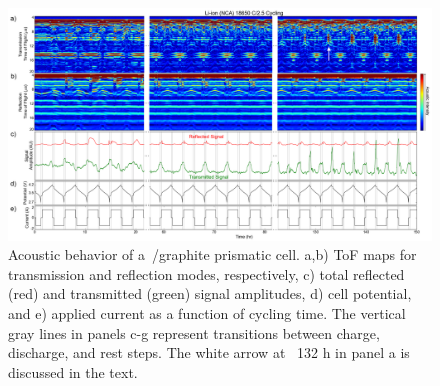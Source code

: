 \begin{figure}[htb]
  \centering
    \includegraphics[width=\textwidth]{ch4-bw/images/nca.png}
    \caption[Acoustic behavior of an NCA/graphite 18650 cell from cycle 1 to 34.]{Acoustic behavior of a~/graphite prismatic cell. a,b) ToF maps for transmission and reflection modes, respectively, c) total reflected (red) and transmitted (green) signal amplitudes, d) cell potential, and e) applied current as a function of cycling time. The vertical gray lines in panels c-g represent transitions between charge, discharge, and rest steps. The white arrow at ~132 h in panel a is discussed in the text.}
    \label{fig:nca}
\end{figure}
	
